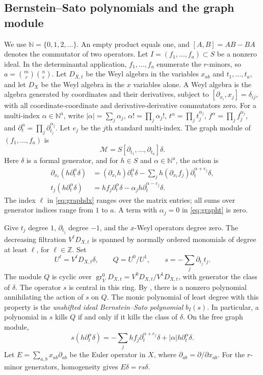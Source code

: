 \documentclass[11pt,a4paper]{article}
\numberwithin{equation}{section}
\theoremstyle{definition}
\newcommand{\Z}{\mathbb Z}
\newcommand{\N}{\mathbb N}
\DeclareMathOperator{\gr}{gr}
\begin{document}
\subsection{Bernstein--Sato polynomials and the graph module}\label{subsec:graph}
We use $\N=\{0,1,2,\ldots\}$. An empty product equals one, and
$[A,B]=AB-BA$ denotes the commutator of two operators.
Let $I=(f_1,\ldots,f_a)\subset S$ be a nonzero ideal. In the
determinantal application, $f_1,\ldots,f_a$ enumerate the $r$-minors,
so $a=\binom mr\binom nr$. Let $D_{X,t}$ be the Weyl algebra in the
variables $x_{ab}$ and $t_1,\ldots,t_a$, and let $D_X$ be the Weyl
algebra in the $x$ variables alone. A Weyl algebra is the algebra generated
by coordinates and their derivatives, subject to
$[\partial_{x_i},x_j]=\delta_{ij}$, with all coordinate-coordinate
and derivative-derivative commutators zero. For a multi-index $\alpha\in\N^a$,
write $|\alpha|=\sum_j\alpha_j$, $\alpha!=\prod_j\alpha_j!$,
$t^\alpha=\prod_jt_j^{\alpha_j}$, $f^\alpha=\prod_jf_j^{\alpha_j}$,
and $\partial_t^\alpha=\prod_j\partial_{t_j}^{\alpha_j}$.
Let $e_j$ be the $j$th standard multi-index.
The graph module of $(f_1,\ldots,f_a)$ is
\[
\mathcal M=S[\partial_{t_1},\ldots,\partial_{t_a}]\delta.
\]
Here $\delta$ is a formal generator, and for $h\in S$ and
$\alpha\in\N^a$, the action is
\begin{align}
\partial_{x_\ell}(h\partial_t^\alpha\delta)
 &= (\partial_{x_\ell}h)\partial_t^\alpha\delta
       -\sum_j h(\partial_{x_\ell}f_j)
                       \partial_t^{\alpha+e_j}\delta,\label{eq:graphdx}\\
t_j(h\partial_t^\alpha\delta)
 &=hf_j\partial_t^\alpha\delta
       -\alpha_jh\partial_t^{\alpha-e_j}\delta.\label{eq:grapht}
\end{align}
The index $\ell$ in \eqref{eq:graphdx} ranges over the matrix entries;
all sums over generator indices range from $1$ to $a$.
A term with $\alpha_j=0$ in \eqref{eq:grapht} is zero.

Give $t_j$ degree $1$, $\partial_{t_j}$ degree $-1$, and the $x$-Weyl
operators degree zero. The decreasing filtration $V^\ell D_{X,t}$
is spanned by normally ordered monomials of degree at least $\ell$,
for $\ell\in\Z$.
Set
\[
U^\ell=V^\ell D_{X,t}\delta,\qquad Q=U^0/U^1,\qquad
s=-\sum_j\partial_{t_j}t_j.
\]
The module $Q$ is cyclic over $\gr_V^0D_{X,t}=V^0D_{X,t}/V^1D_{X,t}$,
with generator the class of $\delta$. The operator $s$ is central in
this ring. By \cite[Sections~2.4--2.5]{BMS}, there is a nonzero polynomial
annihilating the action of $s$ on $Q$. The monic polynomial of least
degree with this property is the \emph{unshifted ideal Bernstein--Sato
polynomial} $b_I(s)$.
In particular, a polynomial in $s$ kills $Q$ if and only if it kills
the class of $\delta$. On the free graph module,
\begin{equation}\label{eq:saction}
s(h\partial_t^\alpha\delta)=
-\sum_jhf_j\partial_t^{\alpha+e_j}\delta
       +|\alpha|h\partial_t^\alpha\delta.
\end{equation}
Let $E=\sum_{a,b}x_{ab}\partial_{ab}$ be the Euler operator in $X$,
where $\partial_{ab}=\partial/\partial x_{ab}$. For the $r$-minor generators, homogeneity gives
$E\delta=rs\delta$.
\end{document}
